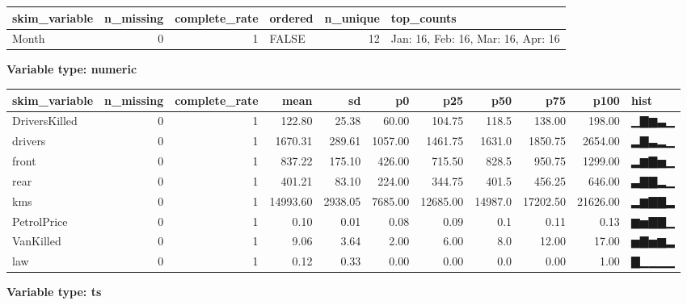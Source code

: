 \documentclass[
]{article}
\begin{document}
\begin{longtable}[]{@{}lrrlrl@{}}
\toprule
skim\_variable & n\_missing & complete\_rate & ordered & n\_unique &
top\_counts \\
\midrule
\endhead
Month & 0 & 1 & FALSE & 12 & Jan: 16, Feb: 16, Mar: 16, Apr: 16 \\
\bottomrule
\end{longtable}

\textbf{Variable type: numeric}

\begin{longtable}[]{@{}lrrrrrrrrrl@{}}
\toprule
skim\_variable & n\_missing & complete\_rate & mean & sd & p0 & p25 &
p50 & p75 & p100 & hist \\
\midrule
\endhead
DriversKilled & 0 & 1 & 122.80 & 25.38 & 60.00 & 104.75 & 118.5 & 138.00
& 198.00 & ▁▇▆▃▁ \\
drivers & 0 & 1 & 1670.31 & 289.61 & 1057.00 & 1461.75 & 1631.0 &
1850.75 & 2654.00 & ▂▇▃▂▁ \\
front & 0 & 1 & 837.22 & 175.10 & 426.00 & 715.50 & 828.5 & 950.75 &
1299.00 & ▂▆▇▅▁ \\
rear & 0 & 1 & 401.21 & 83.10 & 224.00 & 344.75 & 401.5 & 456.25 &
646.00 & ▃▇▇▂▁ \\
kms & 0 & 1 & 14993.60 & 2938.05 & 7685.00 & 12685.00 & 14987.0 &
17202.50 & 21626.00 & ▂▆▇▇▂ \\
PetrolPrice & 0 & 1 & 0.10 & 0.01 & 0.08 & 0.09 & 0.1 & 0.11 & 0.13 &
▆▅▇▇▁ \\
VanKilled & 0 & 1 & 9.06 & 3.64 & 2.00 & 6.00 & 8.0 & 12.00 & 17.00 &
▅▇▅▆▂ \\
law & 0 & 1 & 0.12 & 0.33 & 0.00 & 0.00 & 0.0 & 0.00 & 1.00 & ▇▁▁▁▁ \\
\bottomrule
\end{longtable}

\textbf{Variable type: ts}
\end{document}
